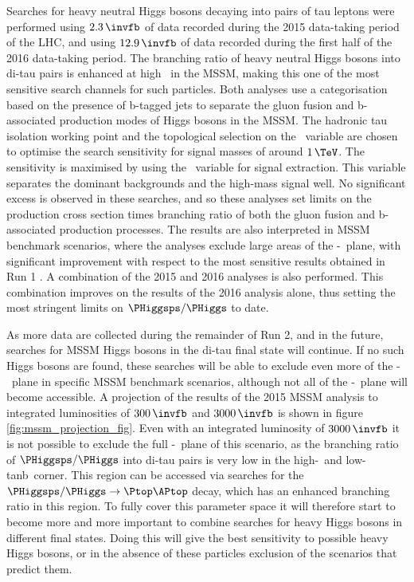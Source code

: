 Searches for heavy neutral Higgs bosons decaying into pairs of tau leptons were performed
using $2.3\,\invfb$ of data recorded during the 2015
data-taking period of the \ac{LHC}, and using $12.9\,\invfb$ of 
data recorded during the first half of the 2016 data-taking period. The 
branching ratio of heavy neutral Higgs bosons into di-tau pairs is enhanced at high \tanb~in the \ac{MSSM},
making this one of the most sensitive search channels for such particles. Both analyses use a categorisation 
based on the presence of b-tagged jets to separate
the gluon fusion and b-associated production modes of Higgs bosons in the \ac{MSSM}. 
The hadronic tau isolation working point and the topological selection on 
the \mT~variable are chosen to optimise the search sensitivity for signal
masses of around $1\,\TeV$.
The sensitivity is maximised by using the \mTtot~variable for signal extraction.
This variable separates the dominant backgrounds
and the high-mass signal well.
No significant excess is observed in these searches, and so 
these analyses set limits on the production cross section times branching ratio of both the
gluon fusion and b-associated production processes. The results are also
interpreted in \ac{MSSM} benchmark scenarios, where the analyses exclude large areas
of the \mA-\tanb~plane, with significant improvement with respect to the most sensitive
results obtained in Run 1 \cite{CMS-PAS-HIG-16-006,CMS-PAS-HIG-16-037}. A combination of the 2015 and 2016 analyses is also
performed. This combination improves on the results of the 2016 analysis alone, thus
setting the most stringent limits on $\PHiggsps/\PHiggs$ to date.

As more data are collected during the remainder of Run 2, and in the 
future, searches for \ac{MSSM} Higgs bosons in the di-tau final
state will continue. If no such Higgs bosons are found, these searches
will be able to exclude even more of the \mA-\tanb~plane in specific
\ac{MSSM} benchmark scenarios, although not all of the \mA-\tanb~plane
will become accessible. A projection of the results of the 2015 \ac{MSSM}
analysis to integrated luminosities of $300\,\invfb$ and $3000\,\invfb$ \cite{HTT-projection} is
shown in figure \ref{fig:mssm_projection_fig}. Even with an integrated luminosity of
$3000\,\invfb$ it is not possible to exclude the full \mA-\tanb~plane of this scenario,
as the branching ratio of $\PHiggsps/\PHiggs$ into di-tau pairs 
is very low in the high-\mA~and low-tanb~corner. This region can be accessed 
via searches for the $\PHiggsps/\PHiggs \rightarrow \Ptop\APtop$ decay, which
has an enhanced branching ratio in this region. To fully cover this
parameter space it will therefore start to become more and more
important to combine searches for heavy Higgs bosons in different final states.
Doing this will give the best sensitivity to possible
heavy Higgs bosons, or in the absence of these particles exclusion
of the scenarios that predict them.

